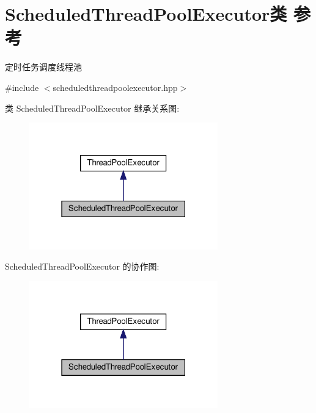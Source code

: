 \hypertarget{classScheduledThreadPoolExecutor}{}\section{Scheduled\+Thread\+Pool\+Executor类 参考}
\label{classScheduledThreadPoolExecutor}


定时任务调度线程池  




{\ttfamily \#include $<$scheduledthreadpoolexecutor.\+hpp$>$}



类 Scheduled\+Thread\+Pool\+Executor 继承关系图\+:\nopagebreak
\begin{figure}[H]
\begin{center}
\leavevmode
\includegraphics[width=231pt]{classScheduledThreadPoolExecutor__inherit__graph}
\end{center}
\end{figure}


Scheduled\+Thread\+Pool\+Executor 的协作图\+:\nopagebreak
\begin{figure}[H]
\begin{center}
\leavevmode
\includegraphics[width=231pt]{classScheduledThreadPoolExecutor__coll__graph}
\end{center}
\end{figure}
